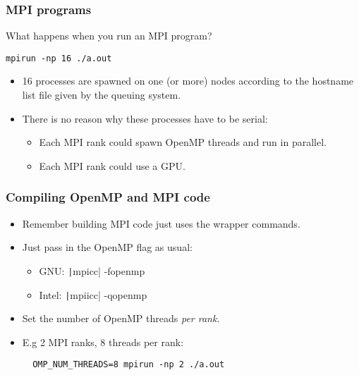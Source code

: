 \documentclass{beamer}
\begin{document}
\begin{frame}[fragile]
\frametitle{MPI programs}
What happens when you run an MPI program?
\begin{verbatim}
mpirun -np 16 ./a.out
\end{verbatim}

\begin{itemize}
  \item 16 processes are spawned on one (or more) nodes according to the hostname list file given by the queuing system.
  \item There is no reason why these processes have to be serial:
  \begin{itemize}
    \item Each MPI rank could spawn OpenMP threads and run in parallel.
    \item Each MPI rank could use a GPU.
  \end{itemize}
\end{itemize}

\end{frame}

\begin{frame}[fragile]
\frametitle{Compiling OpenMP and MPI code}
\begin{itemize}
  \item Remember building MPI code just uses the wrapper commands.
  \item Just pass in the OpenMP flag as usual:
    \begin{itemize}
      \item GNU: \texttt|mpicc| -fopenmp
      \item Intel: \texttt|mpiicc| -qopenmp
    \end{itemize}
  \item Set the number of OpenMP threads \emph{per rank}.
  \item E.g 2 MPI ranks, 8 threads per rank:
  \begin{verbatim}
  OMP_NUM_THREADS=8 mpirun -np 2 ./a.out
  \end{verbatim}
\end{itemize}
\end{frame}
\end{document}
